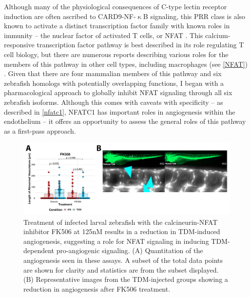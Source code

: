 Although many of the physiological consequences of C\hyp{}type lectin receptor induction are often ascribed to CARD9\hyp{}NF\hyp{}$\upkappa$B signaling, this PRR class is also known to activate a distinct transcription factor family with known roles in immunity -- the nuclear factor of activated T cells, or NFAT \citep{Goodridge2007, Deerhake2021}. This calcium\hyp{}responsive transcription factor pathway is best described in its role regulating T cell biology, but there are numerous reports describing various roles for the members of this pathway in other cell types, including macrophages (see \autoref{NFAT}) \citep{Symes1998, Jones2000, Crabtree2002, Horsley2002, Elloumi2012}. Given that there are four mammalian members of this pathway and six zebrafish homologs with potentially overlapping functions, I began with a pharmacological approach to globally inhibit NFAT signaling through all six zebrafish isoforms. Although this comes with caveats with specificity -- as described in \autoref{nfatc1}, NFATC1 has important roles in angiogenesis within the endothelium -- it offers an opportunity to assess the general roles of this pathway as a first\hyp{}pass approach. 

\begin{figure}
\centering
\includegraphics[width=\textwidth]{images/fk506tdm.pdf}
\caption[FK506 treatment inhibits TDM\hyp{}mediated angiogenesis]{Treatment of infected larval zebrafish with the calcineurin\hyp{}NFAT inhibitor FK506 at 125nM results in a reduction in TDM\hyp{}induced angiogenesis, suggesting a role for NFAT signaling in inducing TDM\hyp{}dependent pro\hyp{}angiogenic signaling. (A) Quantitation of the angiogenesis seen in these assays. A subset of the total data points are shown for clarity and statistics are from the subset displayed. (B) Representative images from the TDM\hyp{}injected groups showing a reduction in angiogenesis after FK506 treatment.}
\label{figure:fk506tdm}
\end{figure}

